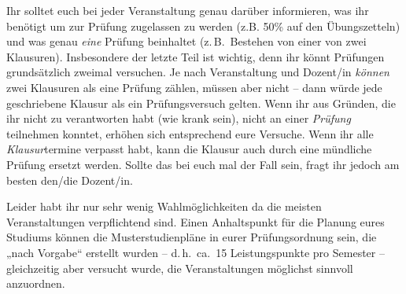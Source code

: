 Ihr solltet euch bei jeder Veranstaltung genau darüber informieren, was ihr
benötigt um zur Prüfung zugelassen zu werden (z.B. 50\% auf den Übungszetteln)
und was genau \emph{eine} Prüfung beinhaltet (z.\,B.\ Bestehen von einer von
zwei Klausuren). Insbesondere der letzte Teil ist wichtig, denn ihr könnt
Prüfungen grundsätzlich zweimal versuchen. Je nach Veranstaltung und Dozent/in
\emph{können} zwei Klausuren als eine Prüfung zählen, müssen aber nicht -- dann
würde jede geschriebene Klausur als ein Prüfungsversuch gelten. Wenn ihr aus
Gründen, die ihr nicht zu verantworten habt (wie krank sein), nicht an einer
\emph{Prüfung} teilnehmen konntet, erhöhen sich entsprechend eure Versuche.
Wenn ihr alle \emph{Klausur}termine verpasst habt, kann die Klausur auch durch
eine mündliche Prüfung ersetzt werden. Sollte das bei euch mal der Fall sein,
fragt ihr jedoch am besten den/die Dozent/in.

Leider habt ihr nur sehr wenig Wahlmöglichkeiten da die meisten Veranstaltungen
verpflichtend sind.  Einen Anhaltspunkt für die Planung eures Studiums können
die Musterstudienpläne in eurer Prüfungsordnung sein, die „nach Vorgabe“
erstellt wurden -- d.\,h.\ ca.\ 15 Leistungspunkte pro Semester -- gleichzeitig
aber versucht wurde, die Veranstaltungen möglichst sinnvoll anzuordnen.
